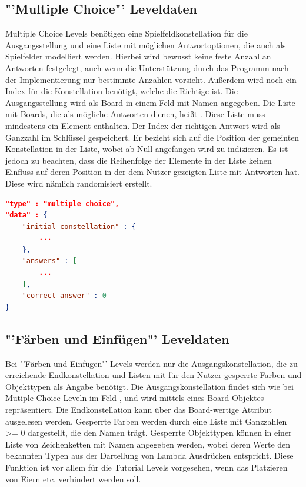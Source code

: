 \subsection{"'Multiple Choice"' Leveldaten}
Multiple Choice Levels benötigen eine Spielfeldkonstellation für die Ausgangsstellung und eine Liste mit möglichen Antwortoptionen, die auch als Spielfelder modelliert werden.
Hierbei wird bewusst keine feste Anzahl an Antworten festgelegt, auch wenn die Unterstützung durch das Programm nach der Implementierung nur bestimmte Anzahlen vorsieht.
Außerdem wird noch ein Index für die Konstellation benötigt, welche die Richtige ist.
Die Ausgangsstellung wird als Board in einem Feld mit Namen  angegeben.
Die Liste mit Boards, die als mögliche Antworten dienen, heißt .
Diese Liste muss mindestens ein Element enthalten.
Der Index der richtigen Antwort wird als Ganzzahl im Schlüssel  gespeichert.
Er bezieht sich auf die Position der gemeinten Konstellation in der  Liste, wobei ab Null angefangen wird zu indizieren.
Es ist jedoch zu beachten, dass die Reihenfolge der Elemente in der Liste keinen Einfluss auf deren Position in der dem Nutzer gezeigten Liste mit Antworten hat.
Diese wird nämlich randomisiert erstellt.

\begin{lstlisting}[language=json,caption={Grober Aufbau des data Attributs eines Multiple Choice Levels}]
"type" : "multiple choice",
"data" : {
	"initial constellation" : {
		...
	},
	"answers" : [
		...
	],
	"correct answer" : 0
}
\end{lstlisting}

\subsection{"'Färben und Einfügen"' Leveldaten}
Bei "'Färben und Einfügen"'-Levels werden nur die Ausgangskonstellation, die zu erreichende Endkonstellation und Listen mit für den Nutzer gesperrte Farben und Objekttypen als Angabe benötigt.
Die Ausgangskonstellation findet sich wie bei Mutiple Choice Leveln im Feld , und wird mittels eines Board Objektes repräsentiert.
Die Endkonstellation kann über das Board-wertige Attribut  ausgelesen werden.
Gesperrte Farben werden durch eine Liste mit Ganzzahlen >= 0 dargestellt, die den Namen  trägt.
Gesperrte Objekttypen können in einer Liste von Zeichenketten mit Namen  angegeben werden, wobei deren Werte den bekannten Typen aus der Dartellung von Lambda Ausdrücken entspricht.
Diese Funktion ist vor allem für die Tutorial Levels vorgesehen, wenn das Platzieren von Eiern etc. verhindert werden soll.

